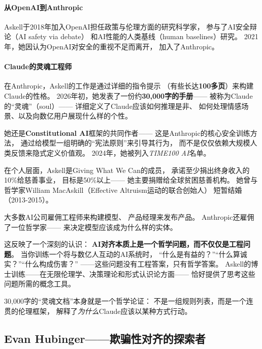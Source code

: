 \paragraph{从OpenAI到Anthropic}
Askell于2018年加入OpenAI担任政策与伦理方面的研究科学家，
参与了AI安全辩论（AI safety via debate）
和AI性能的人类基线（human baselines）研究。
2021年，她因认为OpenAI对安全的重视不足而离开，
加入了Anthropic。

\paragraph{Claude的灵魂工程师}
在Anthropic，Askell的工作是通过详细的指令提示
（有些长达\textbf{100多页}）来构建Claude的性格。
2026年初，她发表了一份约\textbf{30,000字的手册}——
被称为Claude的``灵魂''（soul）——
详细定义了Claude应该如何推理是非、
如何处理情感场景、以及向数亿用户展现什么样的个性。

她还是\textbf{Constitutional AI}框架的共同作者——
这是Anthropic的核心安全训练方法，
通过给模型一组明确的``宪法原则''来引导其行为，
而不是仅仅依赖大规模人类反馈来隐式定义价值观。
2024年，她被列入\textit{TIME100 AI}名单。

在个人层面，Askell是Giving What We Can的成员，
承诺至少捐出终身收入的10\%给慈善事业，
目标是50\%以上——
她主要捐赠给全球贫困慈善机构。
她曾与哲学家William MacAskill（Effective Altruism运动的联合创始人）
短暂结婚（2013-2015）。

\begin{whybox}[为什么Anthropic需要一位哲学家？]
大多数AI公司雇佣工程师来构建模型、
产品经理来发布产品。
Anthropic还雇佣了一位哲学家——
来决定模型应该成为什么样的实体。

这反映了一个深刻的认识：
\textbf{AI对齐本质上是一个哲学问题，而不仅仅是工程问题}。
当你训练一个将与数亿人互动的AI系统时，
``什么是有益的？''``什么算诚实？''``什么构成伤害？''
——这些问题没有工程答案，只有哲学答案。
Askell的博士训练——在无限伦理学、决策理论和形式认识论方面——
恰好提供了思考这些问题所需的概念工具。

30,000字的``灵魂文档''本身就是一个哲学论证：
不是一组规则列表，而是一个连贯的伦理框架，
解释了\textit{为什么}Claude应该以某种方式行动。
\end{whybox}

\subsection{Evan Hubinger——欺骗性对齐的探索者}
\label{subsec:hubinger}

